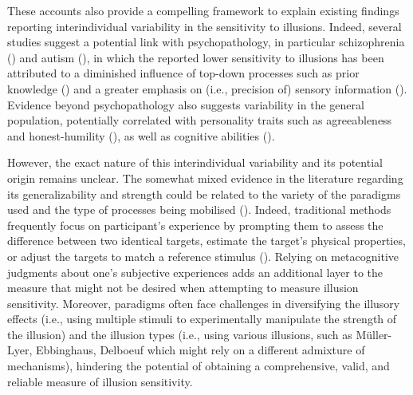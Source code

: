 \documentclass[
  man,
  floatsintext,
  longtable,
  nolmodern,
  notxfonts,
  notimes,
  colorlinks=true,linkcolor=blue,citecolor=blue,urlcolor=blue]{apa7}
\begin{document}
These accounts also provide a compelling framework to explain existing
findings reporting interindividual variability in the sensitivity to
illusions. Indeed, several studies suggest a potential link with
psychopathology, in particular schizophrenia
() and autism
(), in which the reported
lower sensitivity to illusions has been attributed to a diminished
influence of top-down processes such as prior knowledge
() and a greater
emphasis on (i.e., precision of) sensory information
(). Evidence beyond
psychopathology also suggests variability in the general population,
potentially correlated with personality traits such as agreeableness and
honest-humility (), as
well as cognitive abilities ().

However, the exact nature of this interindividual variability and its
potential origin remains unclear. The somewhat mixed evidence in the
literature regarding its generalizability and strength could be related
to the variety of the paradigms used and the type of processes being
mobilised (). Indeed,
traditional methods frequently focus on participant's experience by
prompting them to assess the difference between two identical targets,
estimate the target's physical properties, or adjust the targets to
match a reference stimulus (). Relying on metacognitive judgments about one's subjective
experiences adds an additional layer to the measure that might not be
desired when attempting to measure illusion sensitivity. Moreover,
paradigms often face challenges in diversifying the illusory effects
(i.e., using multiple stimuli to experimentally manipulate the strength
of the illusion) and the illusion types (i.e., using various illusions,
such as Müller-Lyer, Ebbinghaus, Delboeuf which might rely on a
different admixture of mechanisms), hindering the potential of obtaining
a comprehensive, valid, and reliable measure of illusion sensitivity.
\end{document}
